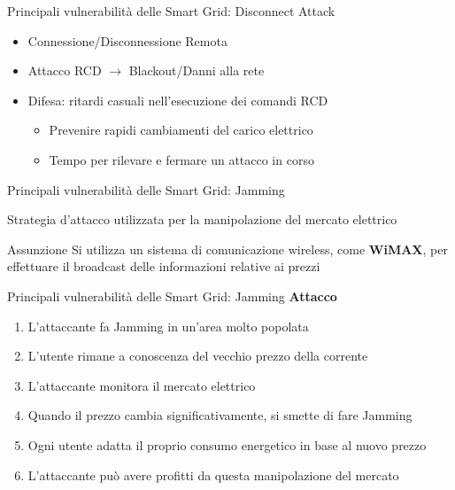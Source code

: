 
\begin{frame}{Principali vulnerabilità delle Smart Grid: Disconnect Attack}
	\begin{itemize}[<+- | alert@+>]
		\item Connessione/Disconnessione Remota
		\item Attacco RCD $\rightarrow$ Blackout/Danni alla rete
		\item Difesa: ritardi casuali nell'esecuzione dei comandi RCD
		\begin{itemize}
			\item Prevenire rapidi cambiamenti del carico elettrico
			\item Tempo per rilevare e fermare un attacco in corso
		\end{itemize}
	\end{itemize}
\end{frame}


\begin{frame}{Principali vulnerabilità delle Smart Grid: Jamming}
	\begin{block}{}
	Strategia d'attacco utilizzata per la manipolazione del mercato elettrico
	\end{block}
	\pause
	\begin{block}{Assunzione}
	Si utilizza un sistema di comunicazione wireless, come \textbf{\color{blue_slides}WiMAX}, per effettuare il broadcast delle informazioni relative ai prezzi
	\end{block}
\end{frame}

\begin{frame}{Principali vulnerabilità delle Smart Grid: Jamming}
	\textbf{Attacco}
	\begin{enumerate}[<+- | alert@+>]
		\item L'attaccante fa Jamming in un'area molto popolata
		\item L'utente rimane a conoscenza del vecchio prezzo della corrente
		\item L'attaccante monitora il mercato elettrico
		\item Quando il prezzo cambia significativamente, si smette di fare Jamming
		\item Ogni utente adatta il proprio consumo energetico in base al nuovo prezzo
		\item L'attaccante può avere profitti da questa manipolazione del mercato
	\end{enumerate}
\end{frame}

